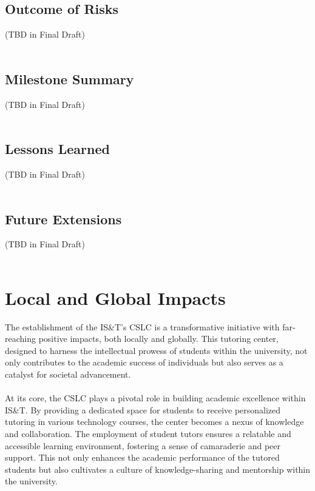 \documentclass[oneside,openany,obeyspaces]{book}
\newcommand\tab[1][1cm]{\hspace*{#1}}
\begin{document}
\begin{flushleft}
    \section{Outcome of Risks}

    \tab (TBD in Final Draft)\\~\\


    \section{Milestone Summary}

    \tab (TBD in Final Draft)\\~\\


    \section{Lessons Learned}

    \tab (TBD in Final Draft)\\~\\


    \section{Future Extensions}

    \tab (TBD in Final Draft)\\~\\




    \chapter{Local and Global Impacts}

    \tab The establishment of the IS\&T's CSLC is a transformative initiative with far-reaching positive impacts, both locally and globally. This tutoring center, designed to harness the intellectual prowess of students within the university, not only contributes to the academic success of individuals but also serves as a catalyst for societal advancement.\\~\\

    \tab At its core, the CSLC plays a pivotal role in building academic excellence within IS\&T. By providing a dedicated space for students to receive personalized tutoring in various technology courses, the center becomes a nexus of knowledge and collaboration. The employment of student tutors ensures a relatable and accessible learning environment, fostering a sense of camaraderie and peer support. This not only enhances the academic performance of the tutored students but also cultivates a culture of knowledge-sharing and mentorship within the university.\\~\\


\end{flushleft}
\end{document}
